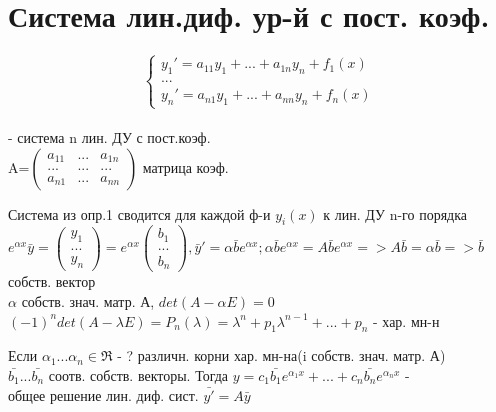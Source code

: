 \section{Система лин.диф. ур-й с пост. коэф.}

\begin{Def}
    \[\begin{cases}
    y_1'=a_{11}y_1+...+a_{1n}y_n+f_1(x)\\
    ...\\
    y_n'=a_{n1}y_1+...+a_{nn}y_n+f_n(x)
    \end{cases}\]
\\
- система n лин. ДУ с пост.коэф.\\
A=$\begin{pmatrix} a_{11}& ...& a_{1n}\\  ...& ...& ...\\ a_{n1}& ...& a_{nn}\end{pmatrix}$ матрица коэф.\\
\end{Def}

\begin{Note}
    Система из опр.1 сводится для каждой ф-и $y_i(x)$ к лин. ДУ n-го порядка\\
    $e^{\alpha x} \bar{y}=\begin{pmatrix} y_{1}\\  ...\\ y_{n}\end{pmatrix}=e^{\alpha x}\begin{pmatrix} b_{1}\\  ...\\ b_{n}\end{pmatrix} ,\bar{y}'=\alpha \bar{b}e^{\alpha x}; \alpha \bar{b} e^{\alpha x}=A\bar{b} e^{\alpha x}=>A\bar{b}=\alpha \bar{b}=>\bar{b}$ собств. вектор\\
    $\alpha$ собств. знач. матр. А, $det(A-\alpha E)=0$\\
    $(-1)^n det(A-\lambda E)=P_n(\lambda)=\lambda^n+p_1 \lambda^{n-1}+...+p_n$ - хар. мн-н\\
\end{Note}

\begin{Note}
    Если $\alpha_1...\alpha_n \in \Re$ - ? различн. корни хар. мн-на(i собств. знач. матр. А) \\
    $\bar{b_1}...\bar{b_n}$ соотв. собств. векторы. Тогда $y=c_1\bar{b_1}e^{\alpha_1 x}+...+c_n\bar{b_n}e^{\alpha_n x}$ -\\
    общее решение лин. диф. сист. $\bar{y'}=A\bar{y}$\\
\end{Note}

